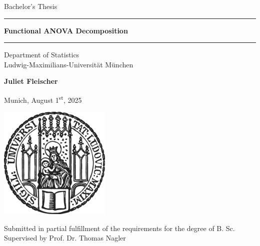 \documentclass[12pt]{article}
\newcommand{\mytitle}{Functional ANOVA Decomposition}
\newcommand{\myname}{Juliet Fleischer}
\newcommand{\mysupervisor}{Prof. Dr. Thomas Nagler}
\begin{document}
 
\begin{titlepage}
\begin{center}
    
\LARGE
Bachelor's Thesis
    
\vspace{0.5cm}
      
\rule{\textwidth}{1.5pt}
\LARGE
\textbf{\mytitle}
\rule{\textwidth}{1.5pt}
   
\vspace{0.5cm}
      
\large
Department of Statistics \\
Ludwig-Maximilians-Universität München 

\vfill

\Large
\textbf{\myname}

\vfill

\large
Munich, August 1\textsuperscript{st}, 2025

\vfill

\includegraphics[width = 0.4\textwidth]{sigillum.png}

\vfill

\normalsize
Submitted in partial fulfillment of the requirements for the degree of B. Sc.
\\

Supervised by \mysupervisor

\end{center}
\end{titlepage}


\newpage

\thispagestyle{empty}
~ 
\newpage
\end{document}
